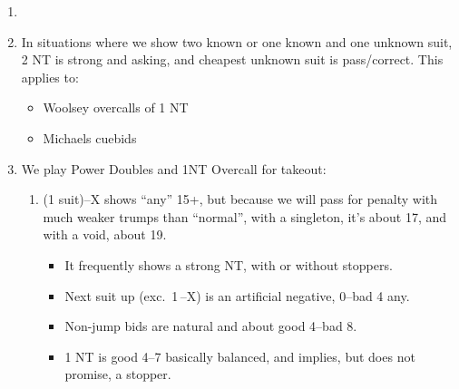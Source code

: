 \documentclass[12pt]{article}
\begin{document}
\begin{footnotesize}
\begin{enumerate}
        \item \label{itm:jacoby2nt}
        \item \label{itm:michaels}In situations where we show two known or one known and one unknown suit, 2 NT is strong and asking, and cheapest unknown suit is pass/correct.
            This applies to:
            \begin{itemize}[nosep]
                \item Woolsey overcalls of 1 NT
                \item Michaels cuebids
            \end{itemize}
        \newpage
        \item We play Power Doubles and 1NT Overcall for takeout:
        \begin{enumerate}[label*=\arabic*,nosep]
            \item \label{itm:pd}(1 suit)--X shows ``any'' 15+, but because we will pass for penalty with much weaker trumps than ``normal'', with a singleton, it's about 17, and with a void, about 19.
            \begin{itemize}[nosep]
                \item It frequently shows a strong NT, with or without stoppers.
                \item Next suit up (exc.\ 1\,\bs--X) is an artificial negative, 0--bad 4 any.
                \item Non-jump bids are natural and about good 4--bad 8.
                \item 1 NT is good 4--7 basically balanced, and implies, but does not promise, a stopper.

\end{itemize}
\end{enumerate}
\end{enumerate}
\end{footnotesize}
\end{document}
